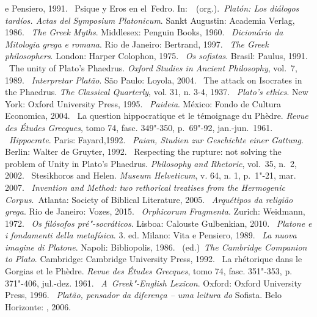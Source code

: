 \begin{bibliohedra}
  e Pensiero, 1991.
~Psique y Eros en el~Fedro. In:~~(org.).~\emph{Platón: Los
  diálogos tardíos. Actas del Symposium
  Platonicum}. Sankt Augustin: Academia Verlag, 1986.
~\emph{The Greek Myths}. Middlesex: Penguin Books, 1960.
~\emph{Dicionário da Mitologia grega e romana}. Rio de
  Janeiro: Bertrand, 1997.
~\emph{The Greek philosophers}. London: Harper
  Colophon, 1975.
~\emph{Os sofistas}. Brasil: Paulus, 1991.
~The unity of Plato's Phaedrus. \emph{Oxford Studies in
  Ancient Philosophy}, vol.~7, 1989. 
~\emph{Interpretar Platão}. São Paulo: Loyola, 2004.
~The attack on Isocrates in the Phaedrus. \emph{The
  Classical Quarterly}, vol. 31, n. 3-4, 1937.
~\emph{Plato's ethics}. New York: Oxford University Press, 1995.
~\emph{Paideia}. México: Fondo de Cultura Economica, 2004.
~La question hippocratique et le témoignage du Phèdre. \emph{Revue des Études Grecques}, tomo 74, fasc. 349"-350, p.~69"-92, jan.-jun.~1961.
~\emph{Hippocrate}. Paris: Fayard,1992.
~\emph{Paian, Studien zur Geschichte einer Gattung}.
  Berlin: Walter de Gruyter, 1992.
~Respecting the rupture: not solving the problem
  of Unity in Plato's Phaedrus. \emph{Philosophy and Rhetoric}, vol.~35, n.~2, 2002.
~Stesikhoros and Helen. \emph{Museum Helveticum}, v.
  64, n. 1, p.~1"-21, mar. 2007.
~\emph{Invention and Method: two rethorical treatises
  from the Hermogenic Corpus}.~Atlanta: Society of Biblical Literature,
  2005.
~\emph{Arquétipos da religião grega}. Rio de Janeiro:
  Vozes, 2015.
~\emph{Orphicorum Fragmenta}. Zurich: Weidmann, 1972.
~\emph{Os filósofos
  pré"-socráticos}. Lisboa: Calouste Gulbenkian, 2010.
~\emph{Platone e i fondamenti della metafísica}. 3. ed. Milano:
  Vita e Pensiero, 1989.
~\emph{La nuova imagine di Platone}. Napoli: Bibliopolis,
  1986.
~(ed.)~\emph{The Cambridge Companion to Plato}. Cambridge:
  Cambridge University Press, 1992.
~La rhétorique dans le Gorgias et le Phèdre. \emph{Revue des Études Grecques}, tomo 74, fasc. 351"-353, p. 371"-406, jul.-dez. 1961.
 ~\emph{A~Greek"-English
  Lexicon}. Oxford: Oxford University Press, 1996.
~\emph{Platão, pensador da diferença -- uma leitura do} Sofista. Belo Horizonte: , 2006.

\end{bibliohedra}
